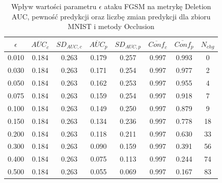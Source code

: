 \begin{table}[H] \centering \caption{Wpływ wartości parametru \(\epsilon\) ataku FGSM na metrykę Deletion AUC, pewność predykcji oraz liczbę zmian predykcji dla zbioru MNIST i metody Occlusion} \label{tab:occ_fgsm_auc_conf_mnist} \begin{tabular}{cccccccc} \toprule $\epsilon$ & $\overline{AUC}_{c}$ & $SD_{AUC,c}$ & $\overline{AUC}_{p}$ & $SD_{AUC,p}$ & $\overline{Conf}_{c}$ & $\overline{Conf}_{p}$ & $N_{chg}$ \\ \midrule 0.010 & 0.184 & 0.263 & 0.179 & 0.257 & 0.997 & 0.993 & 0 \\ 0.030 & 0.184 & 0.263 & 0.171 & 0.254 & 0.997 & 0.977 & 2 \\ 0.050 & 0.184 & 0.263 & 0.162 & 0.253 & 0.997 & 0.955 & 4 \\ 0.075 & 0.184 & 0.263 & 0.159 & 0.254 & 0.997 & 0.918 & 7 \\ 0.100 & 0.184 & 0.263 & 0.149 & 0.250 & 0.997 & 0.879 & 9 \\ 0.150 & 0.184 & 0.263 & 0.134 & 0.236 & 0.997 & 0.778 & 18 \\ 0.200 & 0.184 & 0.263 & 0.118 & 0.211 & 0.997 & 0.630 & 33 \\ 0.300 & 0.184 & 0.263 & 0.090 & 0.159 & 0.997 & 0.391 & 56 \\ 0.400 & 0.184 & 0.263 & 0.075 & 0.113 & 0.997 & 0.244 & 74 \\ 0.500 & 0.184 & 0.263 & 0.055 & 0.069 & 0.997 & 0.167 & 83 \\ \bottomrule \end{tabular} \end{table}